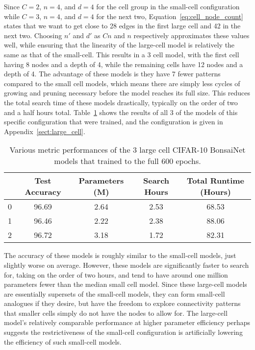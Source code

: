 Since $C=2$, $n=4$, and $d=4$ for the cell group in the small-cell configuration while $C=3$, $n=4$, and $d=4$ for
the next two, Equation~\ref{eq:cell_node_count} states that we want to get close to 28 edges in the first large cell and 42 in the next two.
Choosing $n'$ and $d'$ as $Cn$ and $n$ respectively approximates these values well, while ensuring that the linearity
of the large-cell model is relatively the same as that of the small-cell. This results in a 3 cell model, with the first
cell having 8 nodes and a depth of 4, while the remaining cells have 12 nodes and a depth of 4. The advantage of these
models is they have 7 fewer patterns compared to the small cell models, which means there are simply less cycles of growing
and pruning necessary before the model reaches its full size. This reduces the total search time of these models drastically,
typically on the order of two and a half hours total. Table~\ref{tab:large_cell_metrics} shows the results of all 3 of the
models of this specific configuration that were trained, and the configuration is given in Appendix~\ref{sect:large_cell}.

\begin{table}[h]
\begin{center}
	\begin{tabular}{r|c|c|c|c}
	 & Test Accuracy & Parameters (M) & Search Hours & Total Runtime (Hours) \\
	\hline
	0	    & 96.69 & 2.64 	& 2.53 	& 68.53\\
	1 		& 96.46 & 2.22 	& 2.38 	& 88.06\\
	2		& 96.72	& 3.18	& 1.72	& 82.31\\
	\end{tabular}
\end{center}
\caption{Various metric performances of the 3 large cell CIFAR-10 BonsaiNet models that trained to the full 600 epochs.}
\label{tab:large_cell_metrics}
\end{table}

The accuracy of these models is roughly similar to the small-cell models, just slightly worse on average. However,
these models are significantly faster to search for, taking on the order of two hours, and tend to have around one million
parameters fewer than the median small cell model. Since these large-cell models are essentially supersets of the small-cell
models, they can form small-cell analogues if they desire, but have the freedom to explore connectivity patterns that
smaller cells simply do not have the nodes to allow for. The large-cell model's relatively comparable performance at
higher parameter efficiency perhaps suggests the restrictiveness of the small-cell configuration is artificially lowering the efficiency
of such small-cell models.

